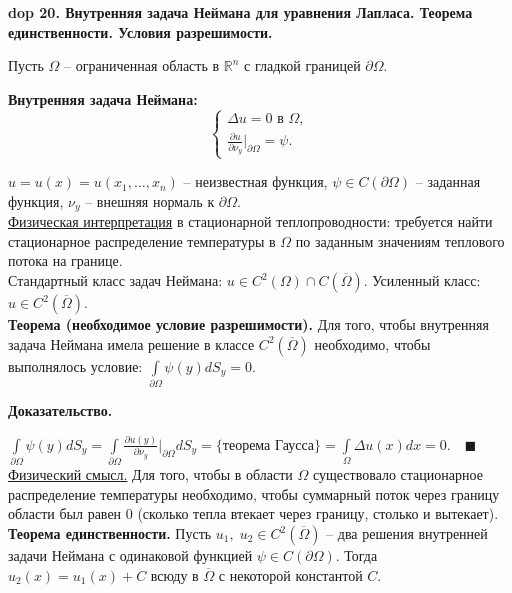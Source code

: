 \setcounter{section}{4}
\setcounter{subsection}{20}
\setcounter{equation}{0}
\textbf{\LARGE dop 20. Внутренняя задача Неймана для уравнения Лапласа. Теорема единственности. Условия разрешимости.}

Пусть $\Omega$ -- ограниченная область в $\mathbb{R}^n$ с гладкой границей $\partial \Omega$.

\textbf{Внутренняя задача Неймана:}
\begin{equation*}
    \begin{cases}
    \Delta u = 0 \text{ в } \Omega, \\
    \frac{\partial u}{\partial \nu_y} \bigg |_{\partial \Omega} = \psi.
    \end{cases}
\end{equation*}

$u = u(x) = u(x_1, \ldots, x_n)$ -- неизвестная функция, $\psi \in C(\partial \Omega)$ -- заданная функция, $\nu_y$ -- внешняя нормаль к $\partial \Omega$.\\

\underline{Физическая интерпретация} в стационарной теплопроводности: требуется найти стационарное распределение температуры в $\Omega$ по заданным значениям теплового потока на границе.\\

Стандартный класс задач Неймана: $u \in C^2(\Omega) \cap C(\overline{\Omega})$. Усиленный класс: $u \in C^2(\overline{\Omega})$.\\

\textbf{Теорема (необходимое условие разрешимости).} Для того, чтобы внутренняя задача Неймана имела решение в классе $C^2(\overline{\Omega})$ необходимо, чтобы выполнялось условие: $\int\limits_{\partial \Omega} \psi(y) dS_y = 0$.

\textbf{Доказательство.} 

$\int\limits_{\partial \Omega} \psi(y) dS_y = \int\limits_{\partial \Omega} \frac{\partial u(y)}{\partial \nu_y} \bigg |_{\partial \Omega} dS_y = \{\text{теорема Гаусса}\} = \int\limits_\Omega \Delta u(x) dx = 0.\quad \blacksquare$
\newline \newline
\underline{Физический смысл.} Для того, чтобы в области $\Omega$ существовало стационарное распределение температуры необходимо, чтобы суммарный поток через границу области был равен 0 (сколько тепла втекает через границу, столько и вытекает).\\

\textbf{Теорема единственности.} Пусть $u_1, \; u_2 \in C^2(\overline{\Omega})$ -- два решения внутренней задачи Неймана с одинаковой функцией $\psi \in C(\partial \Omega)$. Тогда $u_2(x) = u_1(x) + C$ всюду в $\overline{\Omega}$ с некоторой константой $C$.


